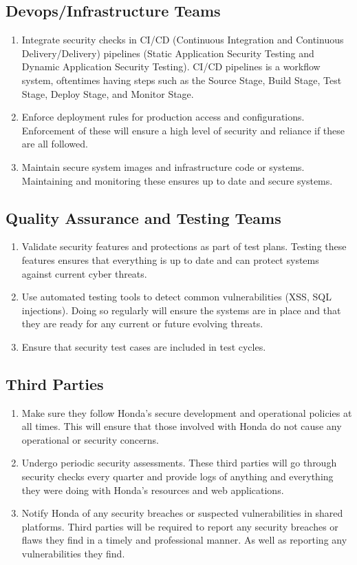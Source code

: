 \subsection{Devops/Infrastructure Teams}
\begin{enumerate}
    \item Integrate security checks in CI/CD (Continuous Integration and Continuous Delivery/Delivery) pipelines (Static Application Security Testing and Dynamic Application Security Testing). CI/CD pipelines is a workflow system, oftentimes having steps such as the Source Stage, Build Stage, Test Stage, Deploy Stage, and Monitor Stage.
    \item Enforce deployment rules for production access and configurations. Enforcement of these will ensure a high level of security and reliance if these are all followed. 
    \item Maintain secure system images and infrastructure code or systems. Maintaining and monitoring these ensures up to date and secure systems.
\end{enumerate}
\subsection{Quality Assurance and Testing Teams}
\begin{enumerate}
    \item Validate security features and protections as part of test plans. Testing these features ensures that everything is up to date and can protect systems against current cyber threats.
    \item Use automated testing tools to detect common vulnerabilities (XSS, SQL injections). Doing so regularly will ensure the systems are in place and that they are ready for any current or future evolving threats.
    \item Ensure that security test cases are included in test cycles.
\end{enumerate}
\subsection{Third Parties}
\begin{enumerate}
    \item Make sure they follow Honda's secure development and operational policies at all times. This will ensure that those involved with Honda do not cause any operational or security concerns.
    \item Undergo periodic security assessments. These third parties will go through security checks every quarter and provide logs of anything and everything they were doing with Honda’s resources and web applications. 
    \item Notify Honda of any security breaches or suspected vulnerabilities in shared platforms. Third parties will be required to report any security breaches or flaws they find in a timely and professional manner. As well as reporting any vulnerabilities they find.
\end{enumerate}
